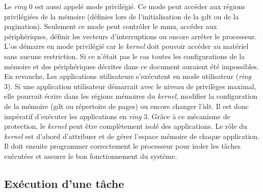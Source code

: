 Le \textit{ring} 0 est aussi appelé mode privilégié. Ce mode peut accéder aux régions
privilégiées de la mémoire (définies lors de l'initialisation de la \acrshort{gdt}
ou de la pagination). Seulement ce mode peut contrôler le \acrshort{mmu}, accéder
aux périphériques, définir les vecteurs d'interruptions ou encore arrêter le
processeur. L'\acrshort{os} démarre en mode privilégié car le \textit{kernel} doit
pouvoir accéder au matériel sans aucune restriction. Si ce n'était pas le cas toutes
les configurations de la mémoire et des périphériques décrites dans ce document
auraient été impossibles. En revanche, Les applications utilisateurs s'exécutent
en mode utilisateur (\textit{ring} 3). Si une application utilisateur démarrait
avec le niveau de privilèges maximal, elle pourrait écrire dans les régions mémoires
du \textit{kernel}, modifier la configuration de la mémoire (\acrshort{gdt} ou 
répertoire de pages) ou encore changer l'\acrshort{idt}. Il est donc impératif
d'exécuter les applications en \textit{ring} 3. Grâce à ce mécanisme de protection,
le \textit{kernel} peut être complètement isolé des applications. Le rôle du \textit{kernel}
est d'abord d'attribuer et de gérer l'espace mémoire de chaque application.
Il doit ensuite programmer correctement le processeur pour isoler les tâches exécutées
et assurer le bon fonctionnement du système.


\subsection{Exécution d'une tâche}
